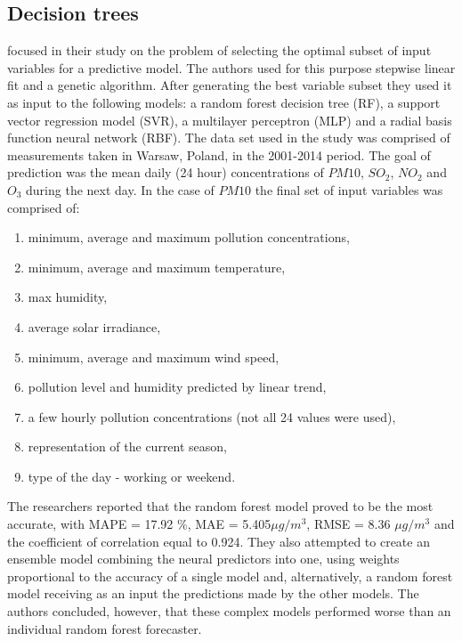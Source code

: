 \subsection{Decision trees}
\cite{SIWEK2016} focused in their study on the problem of selecting the optimal subset of input variables for a predictive model. The authors used for this purpose stepwise linear fit and a genetic algorithm. After generating the best variable subset they used it as input to the following models: a random forest decision tree (RF), a support vector regression model (SVR), a multilayer perceptron (MLP) and a radial basis function neural network (RBF). The data set used in the study was comprised of measurements taken in Warsaw, Poland, in the 2001-2014 period.
The goal of prediction was the mean daily (24 hour) concentrations of $PM10$, $SO_2$, $NO_2$ and $O_3$ during the next day. In the case of $PM10$ the final set of input variables was comprised of:
\begin{enumerate}
    \item minimum, average and maximum pollution concentrations,
    \item minimum, average and maximum temperature,
    \item max humidity,
    \item average solar irradiance,
    \item minimum, average and maximum wind speed,
    \item pollution level and humidity predicted by linear trend,
    \item a few hourly pollution concentrations (not all 24 values were used),
    \item representation of the current season,
    \item type of the day - working or weekend.
\end{enumerate}
The researchers reported that the random forest model proved to be the most accurate, with MAPE = 17.92 $\%$, MAE = 5.405$\mu g / m^3$, RMSE = 8.36 $\mu g / m^3$ and the coefficient of correlation equal to 0.924. They also attempted to create an ensemble model combining the neural predictors into one, using weights proportional to the accuracy of a single model and, alternatively, a random forest model receiving as an input the predictions made by the other models. The authors concluded, however, that these complex models performed worse than an individual random forest forecaster.

